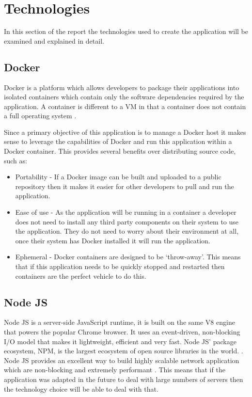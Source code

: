 \section{Technologies}
In this section of the report the technologies used to create the application will be examined and explained in detail.
\subsection{Docker}
\gls{Docker} is a platform which allows developers to package their applications into isolated containers which contain only the software dependencies required by the application. A container is different to a \gls{VM} in that a container does not contain a full operating system \citep{WhatDocker}.

Since a primary objective of this application is to manage a \gls{Docker host} it makes sense to leverage the capabilities of Docker and run this application within a \gls{Docker container}. This provides several benefits over distributing source code, such as:

\begin{itemize}
	\item Portability - If a \gls{Docker image} can be built and uploaded to a public repository then it makes it easier for other developers to pull and run the application.
	\item Ease of use - As the application will be running in a container a developer does not need to install any third party components on their system to use the application. They do not need to worry about their environment at all, once their system has Docker installed it will run the application.
	\item Ephemeral - Docker containers are designed to be `throw-away'. This means that if this application needs to be quickly stopped and restarted then containers are the perfect vehicle to do this.
\end{itemize}
\subsection{Node JS}
\label{sub:nodejs}
Node JS is a server-side JavaScript runtime, it is built on the same V8 engine that powers the popular Chrome browser. It uses an event-driven, non-blocking I/O model that makes it lightweight, efficient and very fast. Node JS' package ecosystem, NPM, is the largest ecosystem of open source libraries in the world. \citep{Nodejs.org2016}. Node JS provides an excellent way to build highly scalable network application which are non-blocking and extremely performant \citep{Griffin2011}. This means that if the application was adapted in the future to deal with large numbers of servers then the technology choice will be able to deal with that.

